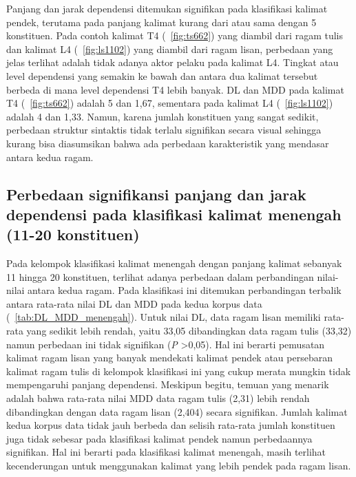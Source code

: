 Panjang dan jarak dependensi ditemukan signifikan pada klasifikasi kalimat pendek, terutama pada panjang kalimat kurang dari atau sama dengan 5 konstituen. Pada contoh kalimat T4 (\pic~\ref{fig:ts662}) yang diambil dari ragam tulis dan kalimat L4 (\pic~\ref{fig:ls1102}) yang diambil dari ragam lisan, perbedaan yang jelas terlihat adalah tidak adanya aktor pelaku pada kalimat L4. Tingkat atau level dependensi yang semakin ke bawah dan antara dua kalimat tersebut berbeda di mana level dependensi T4 lebih banyak. DL dan MDD pada kalimat T4 (\pic~\ref{fig:ts662}) adalah 5 dan 1,67, sementara pada kalimat L4 (\pic~\ref{fig:ls1102}) adalah 4 dan 1,33. Namun, karena jumlah konstituen yang sangat sedikit, perbedaan struktur sintaktis tidak terlalu signifikan secara visual sehingga kurang bisa diasumsikan bahwa ada perbedaan karakteristik yang mendasar antara kedua ragam. 

\subsection{Perbedaan signifikansi panjang dan jarak dependensi pada klasifikasi kalimat menengah (11-20 konstituen)}
Pada kelompok klasifikasi kalimat menengah dengan panjang kalimat sebanyak 11 hingga 20 konstituen, terlihat adanya perbedaan dalam perbandingan nilai-nilai antara kedua ragam. Pada klasifikasi ini ditemukan perbandingan terbalik antara rata-rata nilai DL dan MDD pada kedua korpus data (\tab~\ref{tab:DL_MDD_menengah}). Untuk nilai DL, data ragam lisan memiliki rata-rata yang sedikit lebih rendah, yaitu 33,05 dibandingkan data ragam tulis (33,32) namun perbedaan ini tidak signifikan (\textit{P} \textgreater 0,05). Hal ini berarti pemusatan kalimat ragam lisan yang banyak mendekati kalimat pendek atau persebaran kalimat ragam tulis di kelompok klasifikasi ini yang cukup merata mungkin tidak mempengaruhi panjang dependensi. Meskipun begitu, temuan yang menarik adalah bahwa rata-rata nilai MDD data ragam tulis (2,31) lebih rendah dibandingkan dengan data ragam lisan (2,404) secara signifikan. Jumlah kalimat kedua korpus data tidak jauh berbeda dan selisih rata-rata jumlah konstituen juga tidak sebesar pada klasifikasi kalimat pendek namun perbedaannya signifikan. Hal ini berarti pada klasifikasi kalimat menengah, masih terlihat kecenderungan untuk menggunakan kalimat yang lebih pendek pada ragam lisan.  

